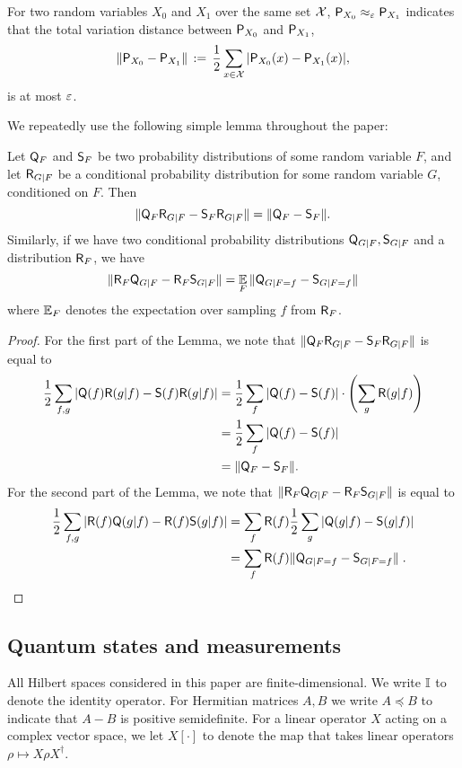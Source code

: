 For two random variables $X_0$ and $X_1$ over the same set $\X$, $\P_{X_0} \approx_\eps \P_{X_1}$ indicates that the total variation distance between $\P_{X_0}$ and $\P_{X_1}$, 
$$\| \P_{X_0} - \P_{X_1} \| \,:=\, \frac{1}{2}\sum_{x \in \X} |\P_{X_0}(x) - \P_{X_1} (x)|,$$
 is at most $\eps$. 

We repeatedly use the following simple lemma throughout the paper:
\begin{lemma}\label{lem:trivial}
Let $\Qsf_F$ and $\Ssf_F$ be two probability distributions of some random variable $F$, and let $\Rsf_{G | F}$ be a conditional probability distribution for some random variable $G$, conditioned on $F$. Then
\[ \| \Qsf_{F} \Rsf_{G|F} - \Ssf_{F} \Rsf_{G|F}\|= \|\Qsf_{F}-\Ssf_{F}\|. \]
Similarly, if we have two conditional probability distributions $\Qsf_{G|F}, \Ssf_{G|F}$ and a distribution $\Rsf_F$, we have
\[
\| \Rsf_F \Qsf_{G|F} - \Rsf_F \Ssf_{G|F} \| = \Ex_F \| \Qsf_{G|F = f} - \Ssf_{G|F=f} \|
\]
where $\Ex_F$ denotes the expectation over sampling $f$ from $\Rsf_F$.
\end{lemma}
\begin{proof}
For the first part of the Lemma, we note that $ \| \Qsf_{F} \Rsf_{G|F} - \Ssf_{F} \Rsf_{G|F}\|$ is equal to
\begin{align*}
 \frac{1}{2}\sum_{f,g} | \Qsf(f) \Rsf(g|f)- \Ssf(f) \Rsf (g|f)|&=  \frac{1}{2}\sum_{f} |\Qsf(f)- \Ssf(f)| \cdot  \left( \sum_{g} \Rsf(g|f)  \right)\\
&= \frac{1}{2}\sum_{f} | \Qsf(f)- \Ssf(f)|\\
&= \|\Qsf_{F}-\Ssf_{F}\|.
\end{align*}
For the second part of the Lemma, we note that $\| \Rsf_F \Qsf_{G|F} - \Rsf_F \Ssf_{G|F} \|$ is equal to
\begin{align*}
\frac{1}{2}\sum_{f,g}	 | \Rsf(f) \Qsf(g|f) - \Rsf(f) \Ssf(g|f) | &= \sum_f \Rsf(f) \frac{1}{2} \sum_g	 | \Qsf(g|f) - \Ssf(g|f) | \\
&= \sum_f \Rsf(f) \| \Qsf_{G|F = f} - \Ssf_{G|F=f} \|\;.
\end{align*}
\end{proof}

\subsection{Quantum states and measurements}
All Hilbert spaces considered in this paper are finite-dimensional. We write $\Id$ to denote the identity operator. For Hermitian matrices $A, B$ we write $A \preceq B$ to indicate that $A - B$ is positive semidefinite. For a linear operator $X$ acting on a complex vector space, we let $X[\cdot]$ to denote the map that takes linear operators $\rho \mapsto X\rho X^\dagger$.

